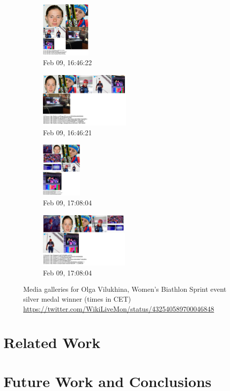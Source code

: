 \documentclass{sig-alternate}
\newcommand{\inlinelistingsize}{\fontsize{8pt}{11pt}}
\let\oldurl\url
\renewcommand{\url}[1]{\inlinelistingsize\oldurl{#1}}
\begin{document}
\begin{figure}
\begin{subfigure}[t]{0.25\textwidth}
    \includegraphics[height=2.75cm]{figures/olga_vilukhina/mediagallery_looseOrder_1391960782060.png}
    \caption{Feb 09, 16:46:22}
    \label{fig:1391960782060}
  \end{subfigure}%
  \begin{subfigure}[t]{0.25\textwidth}
    \includegraphics[height=2.75cm]{figures/olga_vilukhina/mediagallery_strictOrder_1391960781898.png}
    \caption{Feb 09, 16:46:21}
    \label{fig:1391960781898}
  \end{subfigure}
  \begin{subfigure}[t]{0.25\textwidth}
    \includegraphics[height=2.75cm]{figures/olga_vilukhina/mediagallery_looseOrder_1391962084554.png}
    \caption{Feb 09, 17:08:04}
    \label{fig:1391962084554}
  \end{subfigure}%
  \begin{subfigure}[t]{0.25\textwidth}
    \includegraphics[height=2.75cm]{figures/olga_vilukhina/mediagallery_strictOrder_1391962084361.png}
    \caption{Feb 09, 17:08:04}
    \label{fig:1391962084361}
  \end{subfigure}  
  \caption{Media galleries for Olga Vilukhina,
    Women's Biathlon Sprint event silver medal winner (times in CET)
    \url{https://twitter.com/WikiLiveMon/status/432540589700046848}}
  \label{fig:olga-vilukhina}
\end{figure}

\section{Related Work}
\label{sec:related-work}
\selectfont

\section{Future Work and Conclusions}
\label{sec:future-work-and-conclusions}
\selectfont



\balancecolumns
\end{document}
